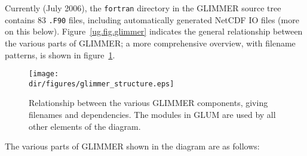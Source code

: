 Currently (July 2006), the \texttt{fortran} directory in the GLIMMER source
tree contains 83 \texttt{.F90} files, including automatically generated
NetCDF IO files (more on this below). Figure~\ref{ug.fig.glimmer} indicates
the general relationship between the various parts of GLIMMER; a more
comprehensive overview, with filename patterns, is shown in
figure~\ref{dg.fig.glimmer_structure}. 
%
\begin{figure}[htbp]
  \centering
  \texttt{[image: \\dir/figures/glimmer\_structure.eps]}
  \caption{Relationship between the various GLIMMER components, giving
  filenames and dependencies. The modules in GLUM are used by all other
  elements of the diagram.}
  \label{dg.fig.glimmer_structure}
\end{figure}
%
The various parts of GLIMMER shown in the diagram are as follows:
%
